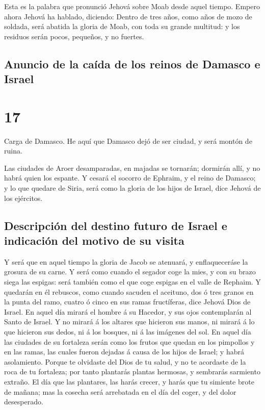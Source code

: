  Esta es la palabra que pronunció Jehová sobre Moab desde
aquel tiempo.  Empero ahora Jehová ha hablado, diciendo:
Dentro de tres años, como años de mozo de soldada, será abatida la
gloria de Moab, con toda su grande multitud: y los residuos serán pocos,
pequeños, y no fuertes.

\hypertarget{anuncio-de-la-cauxedda-de-los-reinos-de-damasco-e-israel}{%
\subsection{Anuncio de la caída de los reinos de Damasco e
Israel}\label{anuncio-de-la-cauxedda-de-los-reinos-de-damasco-e-israel}}

\hypertarget{section-16}{%
\section{17}\label{section-16}}

 Carga de Damasco. He aquí que Damasco dejó de ser ciudad, y
será montón de ruina.

 Las ciudades de Aroer desamparadas, en majadas se tornarán;
dormirán allí, y no habrá quien los espante.  Y cesará el
socorro de Ephraim, y el reino de Damasco; y lo que quedare de Siria,
será como la gloria de los hijos de Israel, dice Jehová de los
ejércitos.

\hypertarget{descripciuxf3n-del-destino-futuro-de-israel-e-indicaciuxf3n-del-motivo-de-su-visita}{%
\subsection{Descripción del destino futuro de Israel e indicación del
motivo de su
visita}\label{descripciuxf3n-del-destino-futuro-de-israel-e-indicaciuxf3n-del-motivo-de-su-visita}}

 Y será que en aquel tiempo la gloria de Jacob se atenuará,
y enflaqueceráse la grosura de su carne.  Y será como cuando
el segador coge la mies, y con su brazo siega las espigas: será también
como el que coge espigas en el valle de Rephaim.  Y quedarán
en él rebuscos, como cuando sacuden el aceituno, dos ó tres granos en la
punta del ramo, cuatro ó cinco en sus ramas fructíferas, dice Jehová
Dios de Israel.  En aquel día mirará el hombre á su Hacedor,
y sus ojos contemplarán al Santo de Israel.  Y no mirará á
los altares que hicieron sus manos, ni mirará á lo que hicieron sus
dedos, ni á los bosques, ni á las imágenes del sol.  En
aquel día las ciudades de su fortaleza serán como los frutos que quedan
en los pimpollos y en las ramas, las cuales fueron dejadas á causa de
los hijos de Israel; y habrá asolamiento.  Porque te
olvidaste del Dios de tu salud, y no te acordaste de la roca de tu
fortaleza; por tanto plantarás plantas hermosas, y sembrarás sarmiento
extraño.  El día que las plantares, las harás crecer, y
harás que tu simiente brote de mañana; mas la cosecha será arrebatada en
el día del coger, y del dolor desesperado.

